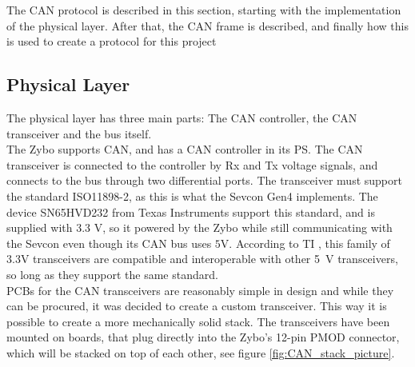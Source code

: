\label{sec:CANbus}
The CAN protocol is described in this section, starting with the implementation of the physical layer.
After that, the CAN frame is described, and finally how this is used to create a protocol for this project

\subsection{Physical Layer}\label{sub:CANphys}
The physical layer has three main parts: The CAN controller, the CAN transceiver and the bus itself. \\

The Zybo supports CAN, and has a CAN controller in its PS.
The CAN transceiver is connected to the controller by Rx and Tx voltage signals, and connects to the bus through two differential ports. 
The transceiver must support the standard ISO11898-2, as this is what the Sevcon Gen4 implements.
The device SN65HVD232 from Texas Instruments support this standard, and is supplied with 3.3 V, so it powered by the Zybo while still communicating with the Sevcon even though its CAN bus uses $\si{5 \volt}$.
According to TI \cite{3.3V_CAN}, this family of $3.3 \si{\volt}$ transceivers are compatible and interoperable with other \si{5 \volt} transceivers, so long as they support the same standard.\\

PCBs for the CAN transceivers are reasonably simple in design and while they can be procured, it was decided to create a custom transceiver.
This way it is possible to create a more mechanically solid stack.
The transceivers have been mounted on boards, that plug directly into the Zybo's 12-pin PMOD connector, which will be stacked on top of each other, see figure \ref{fig:CAN_stack_picture}.

